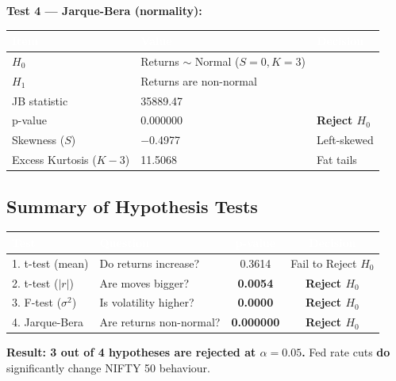 \documentclass[12pt,a4paper]{article}
\begin{document}
\vspace{1em}
\textbf{Test 4 --- Jarque-Bera (normality):}
\begin{table}[H]
\centering
\begin{tabularx}{\textwidth}{|l|l|X|}
\hline
\rowcolor{hdrbg} \textcolor{white}{\textbf{Item}} & \textcolor{white}{\textbf{Value}} & \textcolor{white}{\textbf{Decision}} \\
\hline
$H_0$ & Returns $\sim$ Normal ($S=0, K=3$) & \\
\hline
\rowcolor{rowalt}
$H_1$ & Returns are non-normal & \\
\hline
JB statistic & 35889.47 & \\
\hline
\rowcolor{sigbg}
p-value & 0.000000 & \textbf{Reject $H_0$} \\
\hline
Skewness ($S$) & $-$0.4977 & Left-skewed \\
\hline
\rowcolor{rowalt}
Excess Kurtosis ($K-3$) & 11.5068 & Fat tails \\
\hline
\end{tabularx}
\end{table}

\subsection{Summary of Hypothesis Tests}
\begin{table}[H]
\centering
\begin{tabularx}{\textwidth}{|l|X|c|c|}
\hline
\rowcolor{hdrbg} \textcolor{white}{\textbf{Test}} & \textcolor{white}{\textbf{Question}} & \textcolor{white}{\textbf{p-value}} & \textcolor{white}{\textbf{Decision}} \\
\hline
1. t-test (mean) & Do returns increase? & 0.3614 & Fail to Reject $H_0$ \\
\hline
\rowcolor{sigbg}
2. t-test ($|r|$) & Are moves bigger? & \textbf{0.0054} & \textbf{Reject $H_0$} \\
\hline
\rowcolor{sigbg}
3. F-test ($\sigma^2$) & Is volatility higher? & \textbf{0.0000} & \textbf{Reject $H_0$} \\
\hline
\rowcolor{sigbg}
4. Jarque-Bera & Are returns non-normal? & \textbf{0.000000} & \textbf{Reject $H_0$} \\
\hline
\end{tabularx}
\end{table}

\textbf{Result: 3 out of 4 hypotheses are rejected at $\alpha = 0.05$.} Fed rate cuts \textbf{do} significantly change NIFTY 50 behaviour.
\end{document}
